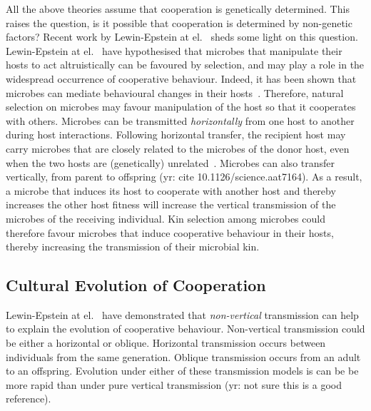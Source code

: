\documentclass{article}
\begin{document}
All the above theories assume that cooperation is genetically determined. This raises the question, is it possible that cooperation is determined by non-genetic factors?
Recent work by Lewin-Epstein at el.~\cite{lewin2017microbes} sheds some light on this question. 
Lewin-Epstein at el.~\cite{lewin2017microbes} have hypothesised that microbes that manipulate their hosts to act altruistically can be favoured by selection, and may play a role in the widespread occurrence of cooperative behaviour. Indeed, it has been shown that microbes can mediate behavioural changes in their hosts~\cite{poulin2010parasite,dobson1988population}. Therefore, natural selection on microbes may favour manipulation of the host so that it cooperates with others. Microbes can be transmitted \emph{horizontally} from one host to another during host interactions. Following horizontal transfer, the recipient host may carry microbes that are closely related to the microbes of the donor host, even when the two hosts are (genetically) unrelated~\cite{lewin2017microbes}. Microbes can also transfer vertically, from parent to offspring (yr: cite 10.1126/science.aat7164). As a result, a microbe that induces its host to cooperate with another host and thereby increases the other host fitness will  increase the vertical transmission of the microbes of the receiving individual. Kin selection among microbes could therefore favour microbes that induce cooperative behaviour in their hosts, thereby increasing the transmission of their microbial kin.

\subsection*{Cultural Evolution of Cooperation}
Lewin-Epstein at el.~\cite{lewin2017microbes} have demonstrated that \emph{non-vertical} transmission can help to explain the evolution of cooperative behaviour. 
Non-vertical transmission could be either a horizontal or oblique. Horizontal transmission occurs between individuals from the same generation. Oblique transmission occurs from an adult to an offspring. 
Evolution under either of these transmission models is can be be more rapid than under pure vertical transmission \cite{ram2018evolution} (yr: not sure this is a good reference).   
\end{document}
